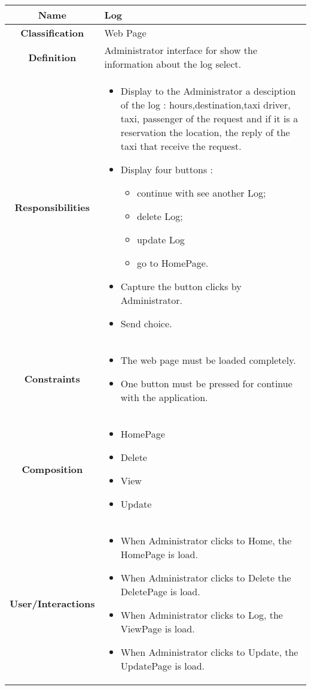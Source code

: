 \documentclass[11pt, a4paper,titlepage]{article}
\begin{document}
\begin{enumerate}
\begin{tabularx}{\textwidth}{| c | X |}
	\hline
	\textbf{Name} & 
	Log
	\\
	\hline
	\textbf{Classification} & 
	Web Page
	\\
	\hline
	\textbf{Definition} & 
     Administrator interface for show the information about the log select.\\
	\hline
	\textbf{Responsibilities} &
	\begin{itemize}
		\item Display to the Administrator a desciption of the log : hours,destination,taxi driver, taxi, passenger of the request and if it is a reservation the location, the reply of the taxi that receive the request.
		\item Display four buttons :
		 \begin{itemize}
			\item continue with see another Log;
			\item delete Log;
			\item update Log
			\item go to HomePage.
		\end{itemize}
		\item Capture the button clicks by Administrator.
		\item Send choice.
	\end{itemize}
	\\
	\hline
	\textbf{Constraints} & 
	\begin{itemize}
		\item  The web page must be loaded completely.
		\item One button must be pressed for continue with the application.
	\end{itemize}
	\\
	\hline
	\textbf{Composition} & 
		\begin{itemize}
			\item HomePage
			\item Delete
			\item View
			\item Update
		\end{itemize}
	\\
	\hline
	\textbf{User/Interactions} & 
	\begin{itemize}
		\item When Administrator clicks to Home, the HomePage is load.        
		\item When Administrator clicks to Delete the DeletePage is load.        
		\item When Administrator clicks to Log, the ViewPage is load.
		\item When Administrator clicks to Update, the UpdatePage is load.
	\end{itemize}
	\\
	\hline	
\end{tabularx}


\end{enumerate}
\end{document}
